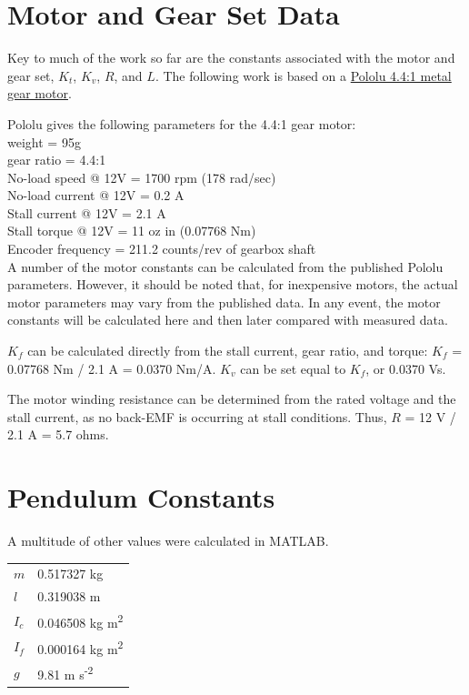 \documentclass[12pt,letterpaper]{article}
\begin{document}
\begin{appendices}

\section{Motor and Gear Set Data}

Key to much of the work so far are the constants associated with the motor and gear set, $K_{t}$, $K_{v}$, $R$, and $L$.
The following work is based on a \href{https://www.pololu.com/product/3237}{Pololu  4.4:1 metal gear motor}.  

Pololu gives the following parameters for the 4.4:1 gear motor: \\
weight = 95g \\
gear ratio = 4.4:1 \\
No-load speed @ 12V = 1700 rpm (178 rad/sec)\\
No-load current @ 12V = 0.2 A \\
Stall current @ 12V = 2.1 A \\
Stall torque @ 12V = 11 oz in (0.07768 Nm)\\
Encoder frequency = 211.2 counts/rev of gearbox shaft\\

A number of the motor constants can be calculated from the published Pololu parameters.  However, it
should  be noted that, for inexpensive motors, the actual motor parameters may vary from the 
published data.  In any event, the motor constants will be calculated here and then later compared
with measured data.

$K_{f}$ can be calculated directly from the stall current, gear ratio, and torque: $K_{f}$ = 0.07768 Nm /  2.1 A = 
0.0370 Nm/A.  $K_{v}$ can be set equal to $K_{f}$, or 0.0370 Vs.

The motor winding resistance can be determined from the rated voltage and the stall current, as no back-EMF is occurring at stall
conditions.  Thus, $R$ = 12 V / 2.1 A = 5.7 ohms.



\section{Pendulum Constants}
A multitude of other values were calculated in MATLAB.  \\

\begin{tabular}{l l}
$m$ & 0.517327 kg \\
$l$ & 0.319038 m \\
$I_{c}$ & 0.046508 kg m\textsuperscript{2} \\
$I_{f}$ & 0.000164 kg m\textsuperscript{2} \\
$g$ & 9.81 m s\textsuperscript{-2} \\
\end{tabular}





\end{appendices}
\end{document}
